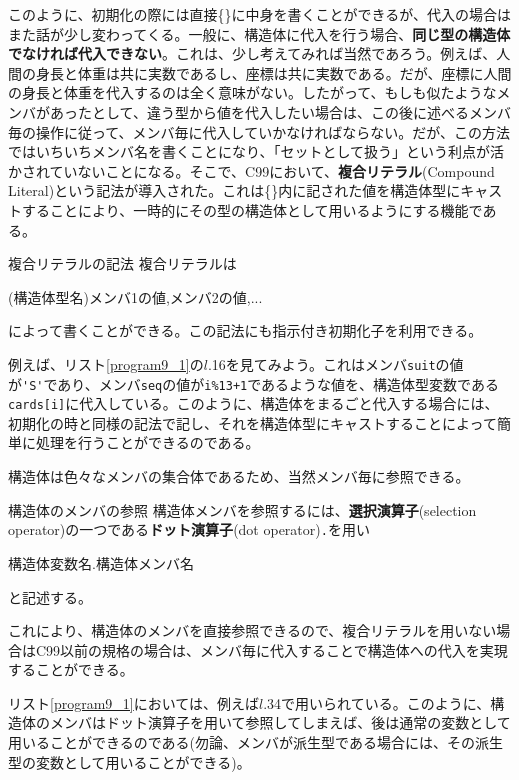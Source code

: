このように、初期化の際には直接\{\}に中身を書くことができるが、代入の場合はまた話が少し変わってくる。一般に、構造体に代入を行う場合、\textbf{同じ型の構造体でなければ代入できない}。これは、少し考えてみれば当然であろう。例えば、人間の身長と体重は共に実数であるし、座標は共に実数である。だが、座標に人間の身長と体重を代入するのは全く意味がない。したがって、もしも似たようなメンバがあったとして、違う型から値を代入したい場合は、この後に述べるメンバ毎の操作に従って、メンバ毎に代入していかなければならない。だが、この方法ではいちいちメンバ名を書くことになり、「セットとして扱う」という利点が活かされていないことになる。そこで、C99において、\textbf{複合リテラル}(Compound Literal)という記法が導入された。これは\{\}内に記された値を構造体型にキャストすることにより、一時的にその型の構造体として用いるようにする機能である。
\begin{itembox}[l]{複合リテラルの記法}
複合リテラルは
\begin{code}
(構造体型名){メンバ1の値,メンバ2の値,...}
\end{code}
によって書くことができる。この記法にも指示付き初期化子を利用できる。
\end{itembox}

例えば、リスト\ref{program9_1}の$l$.16を見てみよう。これはメンバ\verb|suit|の値が\verb|'S'|であり、メンバ\verb|seq|の値が\verb|i%13+1|であるような値を、構造体型変数である\verb|cards[i]|に代入している。このように、構造体をまるごと代入する場合には、初期化の時と同様の記法で記し、それを構造体型にキャストすることによって簡単に処理を行うことができるのである。

構造体は色々なメンバの集合体であるため、当然メンバ毎に参照できる。
\begin{itembox}[l]{構造体のメンバの参照}
構造体メンバを参照するには、\textbf{選択演算子}(selection operator)の一つである\textbf{ドット演算子}(dot operator)\verb|.|を用い
\begin{code}
構造体変数名.構造体メンバ名
\end{code}
と記述する。
\end{itembox}

これにより、構造体のメンバを直接参照できるので、複合リテラルを用いない場合はC99以前の規格の場合は、メンバ毎に代入することで構造体への代入を実現することができる。

リスト\ref{program9_1}においては、例えば$l$.34で用いられている。このように、構造体のメンバはドット演算子を用いて参照してしまえば、後は通常の変数として用いることができるのである(勿論、メンバが派生型である場合には、その派生型の変数として用いることができる)。


